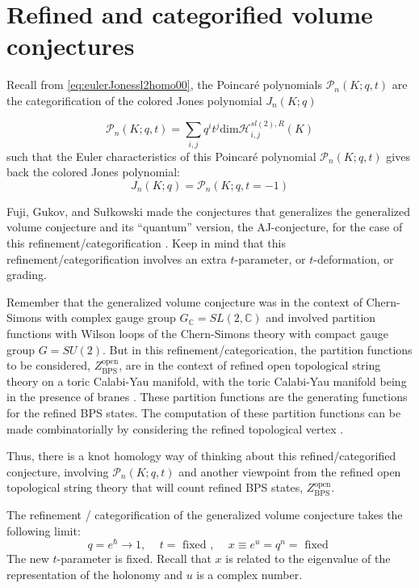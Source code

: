 \documentclass[a4paper,titlepage,twoside]{book}
\begin{document}
\section{Refined and categorified volume conjectures}

Recall from \eqref{eq:eulerJonessl2homo00}, the Poincar\'{e} polynomials $\mathcal{P}_n{(K;q,t)}$ are the categorification of the colored Jones polynomial $J_n{ (K;q)}$

\begin{equation}
\mathcal{P}_n{ (K; q,t) } = \sum_{i,j}q^i t^j \text{dim}{ \mathcal{H}_{i,j}^{ sl{ (2)}, R }{ (K)} }
\end{equation}
such that the Euler characteristics of this Poincar\'{e} polynomial $\mathcal{P}_n{(K;q,t)}$ gives back the colored Jones polynomial:
\begin{equation}
J_n{ (K;q) } = \mathcal{P}_n{ (K; q,t=-1)}
\end{equation}

Fuji, Gukov, and Su\l kowski made the conjectures that generalizes the generalized volume conjecture and its ``quantum'' version, the AJ-conjecture, for the case of this refinement/categorification \cite{FujiGukovSulkowski2012}. Keep in mind that this refinement/categorification involves an extra $t$-parameter, or $t$-deformation, or grading.      

Remember that the generalized volume conjecture was in the context of Chern-Simons with complex gauge group $G_{\mathbb{C}} = SL{(2,\mathbb{C})}$ and involved partition functions with Wilson loops of the Chern-Simons theory with compact gauge group $G=SU(2)$.  But in this refinement/categorication, the partition functions to be considered, $Z^{\text{open}}_{\text{BPS}}$, are in the context of refined open topological string theory on a toric Calabi-Yau manifold, with the toric Calabi-Yau manifold being in the presence of branes \cite{FujiGukovSulkowski2012}.  These partition functions are the generating functions for the refined BPS states.  The computation of these partition functions can be made combinatorially by considering the refined topological vertex \cite{bib:IKV2009}. 

Thus, there is a knot homology way of thinking about this refined/categorified conjecture, involving $\mathcal{P}_n{(K;q,t)}$ and another viewpoint from the refined open topological string theory that will count refined BPS states, $Z^{\text{open}}_{\text{BPS}}$.  

The refinement / categorification of the generalized volume conjecture takes the following limit:
\begin{equation}
  q = e^{\hbar} \to 1, \quad \, t = \text{ fixed }, \quad \, x \equiv e^u = q^n = \text{ fixed }  \label{eq:limitrefinedVC}
\end{equation}
The new $t$-parameter is fixed.  Recall that $x$ is related to the eigenvalue of the representation of the holonomy and $u$ is a complex number.  
\end{document}
